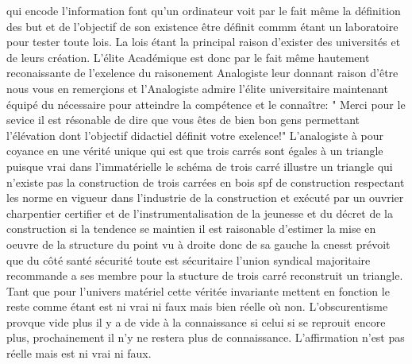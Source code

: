 \documentclass[12pt,a4paper]{article}
\begin{document}
qui encode l'information font qu'un ordinateur voit par le fait même la définition des but et de l'objectif de son existence être définit commm étant un laboratoire pour tester toute lois. La lois étant la principal raison d'exister des universités et de leurs création. L'élite Académique est donc par le fait même hautement reconaissante de l'exelence du raisonement Analogiste leur donnant raison d'être nous vous en remerçions et l'Analogiste admire l'élite universitaire maintenant équipé du nécessaire pour atteindre la compétence et le connaître: " Merci pour le sevice il est résonable de dire que vous êtes de bien bon gens permettant l'élévation dont l'objectif didactiel définit votre exelence!" L'analogiste à pour coyance en une vérité unique qui est que trois carrés sont égales à un triangle puisque vrai dans l'immatérielle le schéma de trois carré illustre un triangle qui n'existe pas la construction de trois carrées en bois spf de construction respectant les norme en vigueur dans l'industrie de la construction et exécuté par un ouvrier charpentier certifier et de l'instrumentalisation de la jeunesse et du décret de la construction si la tendence se maintien il est raisonable d'estimer la mise en oeuvre de la structure du point vu à droite donc de sa gauche la cnesst prévoit que du côté santé sécurité toute est sécuritaire l'union syndical majoritaire recommande a ses membre pour la stucture de trois carré reconstruit un triangle. Tant que pour l'univers matériel cette véritée invariante mettent en fonction le reste comme étant est ni vrai ni faux mais bien réelle où non. L'obscurentisme provque vide plus il y a de vide à la connaissance si celui si se reprouit encore plus, prochainement il n'y ne restera plus de connaissance. L'affirmation n'est pas réelle mais est ni vrai ni faux. 
\end{document}
